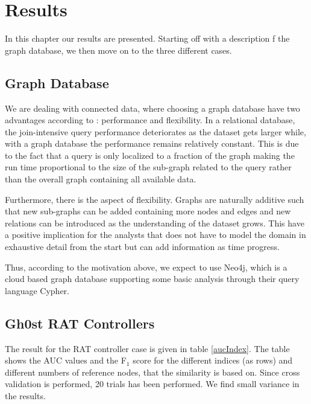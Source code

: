 \chapter{Results}
In this chapter our results are presented. Starting off with a description f the graph database, we then move on to the three different cases. 

\section{Graph Database}
We are dealing with connected data, where choosing a graph database have two advantages according to \citet{robinson2013}: performance and flexibility. In a relational database, the join-intensive query performance deteriorates as the dataset gets larger while, with a graph database the performance remains relatively constant. This is due to the fact that a query is only localized to a fraction of the graph making the run time proportional to the size of the sub-graph related to the query rather than the overall graph containing all available data.

Furthermore, there is the aspect of flexibility. Graphs are naturally additive \cite{robinson2013} such that new sub-graphs can be added containing more nodes and edges and new relations can be introduced as the understanding of the dataset grows. This have a positive implication for the analysts that does not have to model the domain in exhaustive detail from the start but can add information as time progress. 

Thus, according to the motivation above, we expect to use Neo4j, which is a cloud based graph database supporting some basic analysis through their query language Cypher.

\section{Gh0st RAT Controllers}

The result for the RAT controller case is given in table \ref{aucIndex}. The table shows the AUC values and the F$_1$ score for the different indices (as rows) and different numbers of reference nodes, that the similarity is based on. Since cross validation is performed, 20 trials has been performed. We find small variance in the results.

